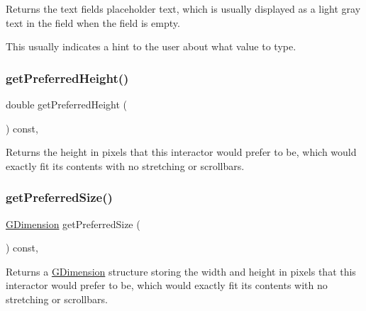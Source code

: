 Returns the text field\textquotesingle{}s placeholder text, which is usually displayed as a light gray text in the field when the field is empty. 

This usually indicates a hint to the user about what value to type. \mbox{\label{classGInteractor_a747de0961653847bdc6615dbf756d715}} 
\subsubsection{\texorpdfstring{get\+Preferred\+Height()}{getPreferredHeight()}}
{\footnotesize\ttfamily double get\+Preferred\+Height (\begin{DoxyParamCaption}{ }\end{DoxyParamCaption}) const\hspace{0.3cm}{\ttfamily [virtual]}, {\ttfamily [inherited]}}



Returns the height in pixels that this interactor would prefer to be, which would exactly fit its contents with no stretching or scrollbars. 

\mbox{\label{classGInteractor_a4aabbee761d8e9116275401131b7ccd1}} 
\subsubsection{\texorpdfstring{get\+Preferred\+Size()}{getPreferredSize()}}
{\footnotesize\ttfamily \mbox{\hyperlink{structGDimension}{G\+Dimension}} get\+Preferred\+Size (\begin{DoxyParamCaption}{ }\end{DoxyParamCaption}) const\hspace{0.3cm}{\ttfamily [virtual]}, {\ttfamily [inherited]}}



Returns a \mbox{\hyperlink{structGDimension}{G\+Dimension}} structure storing the width and height in pixels that this interactor would prefer to be, which would exactly fit its contents with no stretching or scrollbars. 



